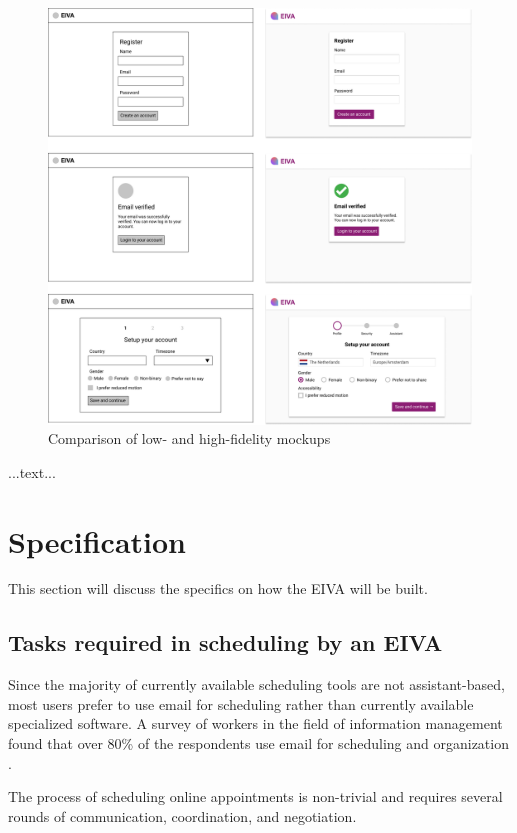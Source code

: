 \documentclass{article}
\begin{document}
\begin{figure}
  \includegraphics[width=\textwidth]{mockup-1.png}
  \caption{Comparison of low- and high-fidelity mockups}
\end{figure}

...text...

\newpage

\section{Specification}

This section will discuss the specifics on how the EIVA will be built.

\subsection{Tasks required in scheduling by an EIVA}

Since the majority of currently available scheduling tools are not assistant-based, most users prefer to use email for scheduling rather than currently available specialized software. A survey of workers in the field of information management found that over 80\% of the respondents use email for scheduling and organization \cite{ducheneaut_e-mail_2001}.

The process of scheduling online appointments is non-trivial and requires several rounds of communication, coordination, and negotiation.
\end{document}
